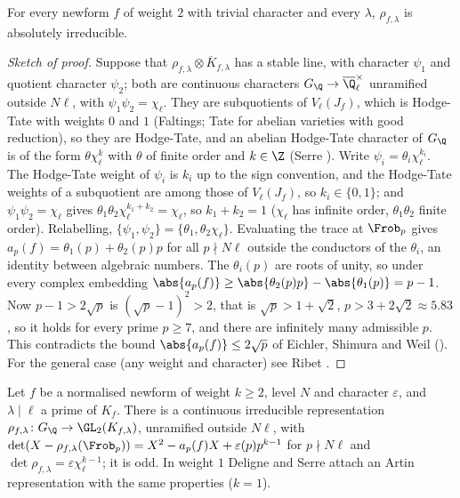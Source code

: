 \begin{proposition}[irreducibility]\label{prop:modgalrep:irreducible}
For every newform $f$ of weight $2$ with trivial character and every $\lambda$, $\rho_{f,\lambda}$ is absolutely irreducible.
\end{proposition}

\begin{proof}[Sketch of proof]
Suppose that $\rho_{f,\lambda}\otimes\overline K_{f,\lambda}$ has a stable line, with character $\psi_1$ and quotient character $\psi_2$; both are continuous characters
$G_\Q\to\overline\Q_\ell^\times$ unramified outside $N\ell$, with $\psi_1\psi_2=\chi_\ell$. They are subquotients of $V_\ell(J_f)$, which is Hodge-Tate with weights $0$
and $1$ (Faltings; Tate for abelian varieties with good reduction), so they are Hodge-Tate, and an abelian Hodge-Tate character of $G_\Q$ is
of the form $\theta\chi_\ell^k$ with $\theta$ of finite order and $k\in\Z$ (Serre \cite{SerreAbelian}). Write $\psi_i=\theta_i\chi_\ell^{k_i}$. The Hodge-Tate weight of $\psi_i$ is
$k_i$ up to the sign convention, and the Hodge-Tate weights of a subquotient are among those of $V_\ell(J_f)$, so $k_i\in\{0,1\}$; and $\psi_1\psi_2=\chi_\ell$ gives
$\theta_1\theta_2\chi_\ell^{k_1+k_2}=\chi_\ell$, so $k_1+k_2=1$ ($\chi_\ell$ has infinite order, $\theta_1\theta_2$ finite order). Relabelling, $\{\psi_1,\psi_2\}=\{\theta_1,\theta_2\chi_\ell\}$. Evaluating the trace
at $\Frob_p$ gives $a_p(f)=\theta_1(p)+\theta_2(p)p$ for all $p\nmid N\ell$ outside the conductors of the $\theta_i$, an identity between algebraic numbers. The $\theta_i(p)$ are roots
of unity, so under every complex embedding $\abs{a_p(f)}\ge\abs{\theta_2(p)p}-\abs{\theta_1(p)}=p-1$. Now $p-1>2\sqrt p$ is $(\sqrt p-1)^2>2$, that is $\sqrt p>1+\sqrt2$, $p>3+2\sqrt2\approx5.83$, so it
holds for every prime $p\ge7$, and there are infinitely many admissible $p$. This contradicts the bound $\abs{a_p(f)}\le2\sqrt p$ of
Eichler, Shimura and Weil (). For the general case (any weight and character) see Ribet \cite{Ribet77}.
\end{proof}

\begin{theorem}\label{thm:modgalrep:deligne}
Let $f$ be a normalised newform of weight $k\ge2$, level $N$ and character $\varepsilon$, and $\lambda\mid\ell$ a prime of $K_f$. There is a continuous
irreducible representation $\rho_{f,\lambda}\colon G_\Q\to\GL_2(K_{f,\lambda})$, unramified outside $N\ell$, with $\det(X-\rho_{f,\lambda}(\Frob_p))=X^2-a_p(f)X+\varepsilon(p)p^{k-1}$
for $p\nmid N\ell$ and $\det\rho_{f,\lambda}=\varepsilon\chi_\ell^{k-1}$; it is odd. In weight $1$ Deligne and Serre attach an Artin representation with the same
properties ($k=1$).
\end{theorem}

